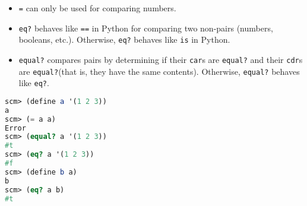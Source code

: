 \begin{itemize}
    \item \texttt{=} can only be used for comparing numbers.
    \item \texttt{eq?} behaves like \texttt{==} in Python for comparing two
        non-pairs (numbers, booleans, etc.).
        Otherwise, \texttt{eq?} behaves like \texttt{is} in Python.
    \item \texttt{equal?} compares pairs by determining if their \texttt{car}s
        are \texttt{equal?} and their \texttt{cdr}s are \texttt{equal?}(that is, they
        have the same contents). Otherwise, \texttt{equal?} behaves like
        \texttt{eq?}.
\end{itemize}

\begin{lstlisting}[language=Scheme]
scm> (define a '(1 2 3))
a
scm> (= a a)
Error
scm> (equal? a '(1 2 3))
#t
scm> (eq? a '(1 2 3))
#f
scm> (define b a)
b
scm> (eq? a b)
#t
\end{lstlisting}
